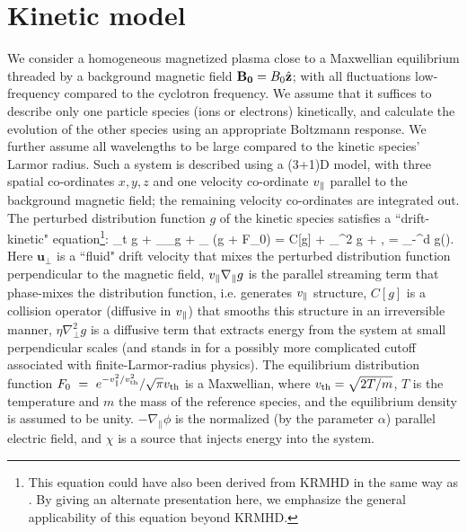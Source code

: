 \section{Kinetic model}
    We consider a homogeneous magnetized plasma close to a Maxwellian equilibrium threaded by
    a background magnetic field $\mathbf{B_0} = B_0 \hat{\mathbf{z}}$; with all fluctuations
    low-frequency compared to the cyclotron frequency. We assume that it suffices to describe
    only one particle species (ions or electrons) kinetically, and calculate the evolution of the
    other species using an appropriate Boltzmann response. We further assume 
    all wavelengths to be large compared to the kinetic species' Larmor radius. Such a
    system is described using a (3+1)D model,
    with three spatial co-ordinates $x, y, z$ and one velocity co-ordinate $v_\parallel$ parallel to the
    background magnetic field; the remaining velocity co-ordinates are integrated out.
    The perturbed distribution function $g$ of the kinetic species satisfies a 
    ``drift-kinetic" equation\footnote{This equation could have also been derived from KRMHD
    in the same way as . By giving an alternate presentation here, we
    emphasize the general applicability of this equation beyond KRMHD.}:
\beq
     \partial_t g + _\perp \cdot \nabla_\perp g + \vpar \nabla_\parallel
     (g + \phi F_0) = C[g] + \eta \nabla_\perp^2 g + \chi, \label{phmixnl:eq:driftkin}
   \eeq
   \beq
     \phi  = \alpha \int_{-\infty}^\infty d \vpar g(\vpar).  \label{phmixnl:eq:boltz}
   \eeq
   Here $\mathbf{u}_\perp$ is a ``fluid" drift velocity that mixes the perturbed
   distribution function perpendicular to the magnetic field, $v_\parallel
   \nabla_\parallel g$ is the parallel streaming term that phase-mixes the distribution
   function, i.e. generates $v_\parallel$ structure, $C[g]$ is a
   collision operator (diffusive in $v_\parallel$) that smooths this structure in an
   irreversible manner,
   $\eta \nabla_\perp^2 g$ is a diffusive term that extracts energy from the system
   at small perpendicular scales (and stands in for a possibly more complicated cutoff
   associated with finite-Larmor-radius physics). The equilibrium distribution function
   $F_0~=~e^{-v_\parallel^2/v_{\rm th}^2}/\sqrt{\pi} v_{\rm th}$ is a Maxwellian, where
   $v_{\rm th}=\sqrt{2 T/m}$, $T$ is the temperature and $m$ the mass of
   the reference species, and the equilibrium density is assumed to be unity. $-\nabla_\parallel \phi$ is the normalized (by the parameter
   $\alpha$) parallel electric field, and $\chi$ is a source that injects energy into the
   system.

